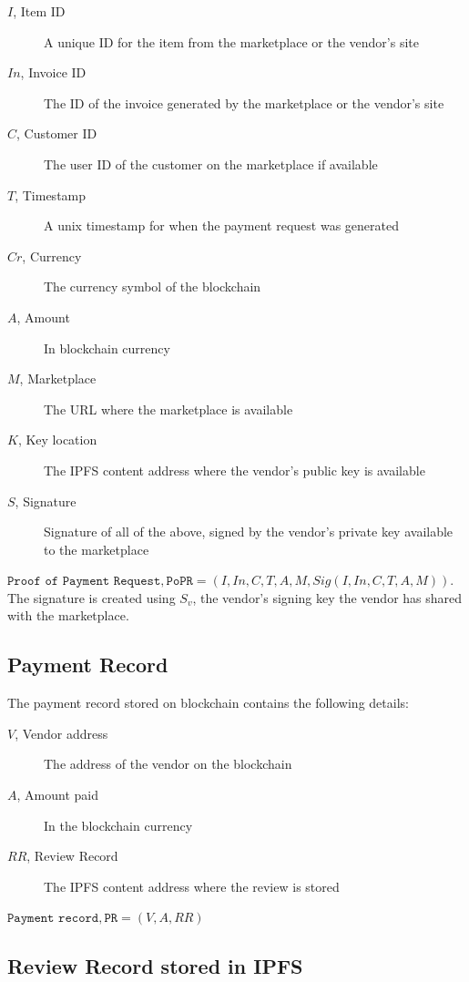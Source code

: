 \documentclass[a4paper]{article}
\begin{document}
\begin{description}
\item[$I$, Item ID] A unique ID for the item from the marketplace or the vendor's site
\item[$In$, Invoice ID] The ID of the invoice generated by the marketplace or the vendor's site
\item[$C$, Customer ID] The user ID of the customer on the marketplace if available
\item[$T$, Timestamp] A unix timestamp for when the payment request was generated
\item[$Cr$, Currency] The currency symbol of the blockchain
\item[$A$, Amount] In blockchain currency 
\item[$M$, Marketplace] The URL where the marketplace is available
\item[$K$, Key location] The IPFS content address where the vendor's public key is available
\item[$S$, Signature] Signature of all of the above, signed by the vendor's private key available to the marketplace
\end{description}

$\texttt{Proof of Payment Request}, \texttt{PoPR} = (I, In, C, T, A,
M, Sig(I,In,C, T, A, M))$. The signature is created using $S_v$, the
vendor's signing key the vendor has shared with the marketplace.


\subsection{Payment Record}

The payment record stored on blockchain contains the following
details:

\begin{description}
\item[$V$, Vendor address] The address of the vendor on the blockchain
\item[$A$, Amount paid] In the blockchain currency
\item[$RR$, Review Record] The IPFS content address where the review
  is stored
\end{description}

$\texttt{Payment record}, \texttt{PR} = (V, A, RR)$


\subsection{Review Record stored in IPFS}
  
\end{document}
